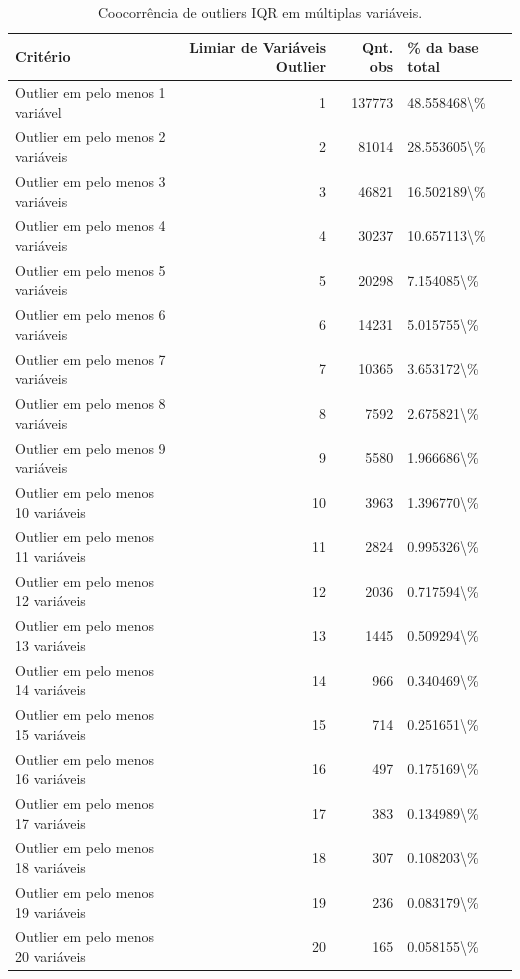 \begin{table}
\caption{Coocorrência de outliers IQR em múltiplas variáveis.}
\label{tab:coocorrencia-outliers-iqr}
\begin{tabular}{lrrl}
\toprule
Critério & Limiar de Variáveis Outlier & Qnt. obs & \% da base total \\
\midrule
Outlier em pelo menos 1 variável & 1 & 137773 & 48.558468\textbackslash \% \\
Outlier em pelo menos 2 variáveis & 2 & 81014 & 28.553605\textbackslash \% \\
Outlier em pelo menos 3 variáveis & 3 & 46821 & 16.502189\textbackslash \% \\
Outlier em pelo menos 4 variáveis & 4 & 30237 & 10.657113\textbackslash \% \\
Outlier em pelo menos 5 variáveis & 5 & 20298 & 7.154085\textbackslash \% \\
Outlier em pelo menos 6 variáveis & 6 & 14231 & 5.015755\textbackslash \% \\
Outlier em pelo menos 7 variáveis & 7 & 10365 & 3.653172\textbackslash \% \\
Outlier em pelo menos 8 variáveis & 8 & 7592 & 2.675821\textbackslash \% \\
Outlier em pelo menos 9 variáveis & 9 & 5580 & 1.966686\textbackslash \% \\
Outlier em pelo menos 10 variáveis & 10 & 3963 & 1.396770\textbackslash \% \\
Outlier em pelo menos 11 variáveis & 11 & 2824 & 0.995326\textbackslash \% \\
Outlier em pelo menos 12 variáveis & 12 & 2036 & 0.717594\textbackslash \% \\
Outlier em pelo menos 13 variáveis & 13 & 1445 & 0.509294\textbackslash \% \\
Outlier em pelo menos 14 variáveis & 14 & 966 & 0.340469\textbackslash \% \\
Outlier em pelo menos 15 variáveis & 15 & 714 & 0.251651\textbackslash \% \\
Outlier em pelo menos 16 variáveis & 16 & 497 & 0.175169\textbackslash \% \\
Outlier em pelo menos 17 variáveis & 17 & 383 & 0.134989\textbackslash \% \\
Outlier em pelo menos 18 variáveis & 18 & 307 & 0.108203\textbackslash \% \\
Outlier em pelo menos 19 variáveis & 19 & 236 & 0.083179\textbackslash \% \\
Outlier em pelo menos 20 variáveis & 20 & 165 & 0.058155\textbackslash \% \\

\end{tabular}
\end{table}
